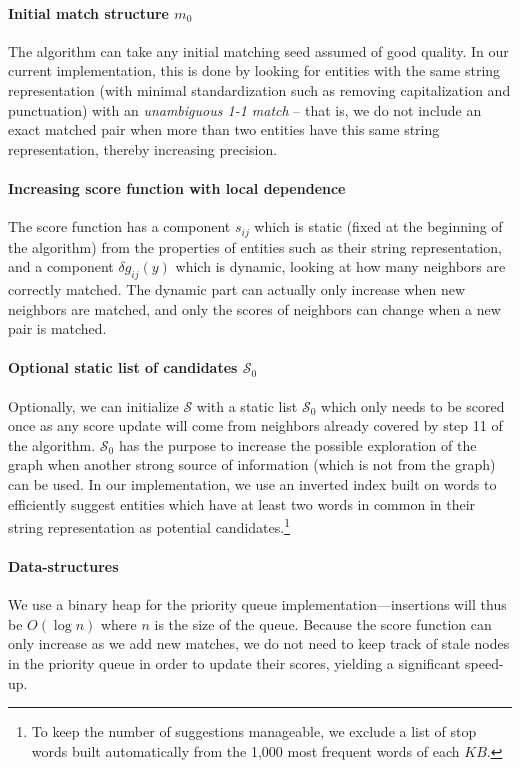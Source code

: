 \documentclass{sig-alternate}
\newcommand{\KB}{K\!B}
\begin{document}
\paragraph*{Initial match structure $m_0$} The algorithm can take any initial matching seed assumed of good quality. In our current implementation, this is done by looking for entities with the same string representation (with minimal standardization such as removing capitalization and punctuation) with an \emph{unambiguous 1-1 match} -- that is, we do not include an exact matched pair when more than two entities have this same string representation, thereby increasing precision. %

\paragraph*{Increasing score function with local dependence} The score function has a component $s_{ij}$ which is static (fixed at the beginning of the algorithm) from the properties of entities such as their string representation, and a component $\delta g_{ij}(y)$ which is dynamic, looking at how many neighbors are correctly matched. The dynamic part can actually only increase when new neighbors are matched, and only the scores of neighbors can change when a new pair is matched.

\paragraph*{Optional static list of candidates $\mathcal{S}_0$} Optionally, we can initialize $\mathcal{S}$ with a static list $\mathcal{S}_0$ which only needs to be scored once as any score update will come from neighbors already covered by step 11 of the algorithm. $\mathcal{S}_0$ has the purpose to increase the possible exploration of the graph when another strong source of information (which is not from the graph) can be used. In our implementation, we use an inverted index built on words to efficiently suggest entities which have at least two words in common in their string representation as potential candidates.\footnote{To keep the number of suggestions manageable, we exclude a list of stop words built automatically from the 1,000 most frequent words of each $\KB$.} %

\paragraph*{Data-structures} We use a binary heap for the priority queue implementation---insertions will thus be $O(\log n)$ where $n$ is the size of the queue. Because the score function can only increase as we add new matches, we do not need to keep track of stale nodes in the priority queue in order to update their scores, yielding a significant speed-up.
%
\end{document}
